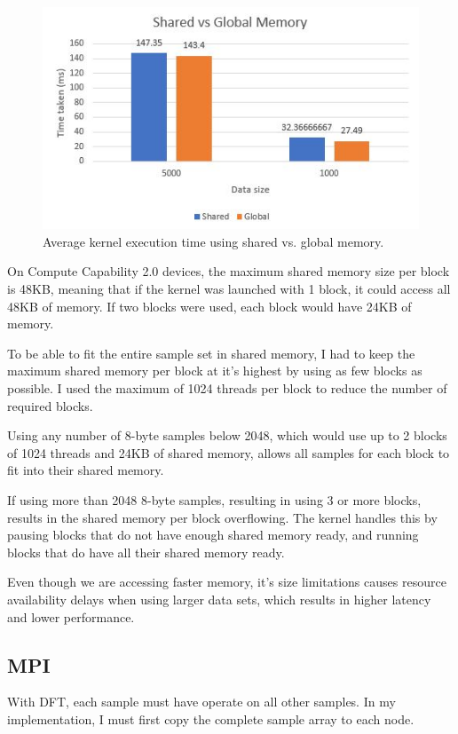 \documentclass[8pt,a4paper]{article}
\begin{document}
\begin{figure}
\begin{center}
\includegraphics[scale=0.6]{shared_vs_global_graph}
\end{center}
\caption{Average kernel execution time using shared vs. global memory.}
\label{fig:shared_vs_global_graph}
\end{figure}
On Compute Capability 2.0 devices, the maximum shared memory size per block is 48KB, meaning that if the kernel was launched with 1 block, it could access all 48KB of memory. If two blocks were used, each block would have 24KB of memory. 

To be able to fit the entire sample set in shared memory, I had to keep the maximum shared memory per block at it's highest by using as few blocks as possible. I used the maximum of 1024 threads per block to reduce the number of required blocks.  

Using any number of 8-byte samples below 2048, which would use up to 2 blocks of 1024 threads and 24KB of shared memory, allows all samples for each block to fit into their shared memory. 

If using more than 2048 8-byte samples, resulting in using 3 or more blocks, results in the shared memory per block overflowing. The kernel handles this by pausing blocks that do not have enough shared memory ready, and running blocks that do have all their shared memory ready.

Even though we are accessing faster memory, it's size limitations causes resource availability delays when using larger data sets, which results in higher latency and lower performance. 


\subsection{MPI}
With DFT, each sample must have operate on all other samples. In my implementation, I must first copy the complete sample array to each node. 
\end{document}
